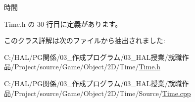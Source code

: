 時間 



 Time.\+h の 30 行目に定義があります。



このクラス詳解は次のファイルから抽出されました\+:\begin{DoxyCompactItemize}
\item 
C\+:/\+H\+A\+L/\+P\+G関係/03\+\_\+作成プログラム/03\+\_\+\+H\+A\+L授業/就職作品/\+Project/source/\+Game/\+Object/2\+D/\+Time/\mbox{\hyperlink{_time_8h}{Time.\+h}}\item 
C\+:/\+H\+A\+L/\+P\+G関係/03\+\_\+作成プログラム/03\+\_\+\+H\+A\+L授業/就職作品/\+Project/source/\+Game/\+Object/2\+D/\+Time/\+Source/\mbox{\hyperlink{_time_8cpp}{Time.\+cpp}}\end{DoxyCompactItemize}
